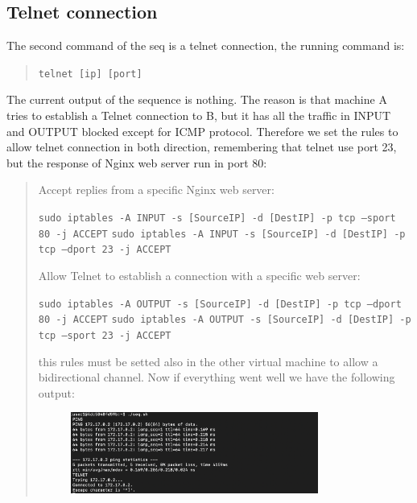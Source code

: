 \documentclass[11pt]{article}
\begin{document}
\subsection{Telnet connection}
The second command of the seq is a telnet connection, the running command is:

\begin{quote}
 \texttt{telnet [ip] [port]}\newline
\end{quote}

The current output of the sequence is nothing. The reason is that machine A tries to establish a Telnet connection to B, but it has all the traffic in INPUT and OUTPUT blocked except for ICMP protocol. Therefore we set the rules to allow telnet connection in both direction, remembering that telnet use port 23, but the response of Nginx web server run in port 80:

\begin{quote}
 Accept replies from a specific Nginx web server:

 \texttt{sudo iptables -A INPUT -s [SourceIP] -d [DestIP] -p tcp --sport 80 -j ACCEPT}\newline
 \texttt{sudo iptables -A INPUT -s [SourceIP] -d [DestIP] -p tcp --dport 23 -j ACCEPT}\newline

 Allow Telnet to establish a connection with a specific web server:

 \texttt{sudo iptables -A OUTPUT -s [SourceIP] -d [DestIP] -p tcp --dport 80 -j ACCEPT}\newline
 \texttt{sudo iptables -A OUTPUT -s [SourceIP] -d [DestIP] -p tcp --sport 23 -j ACCEPT}\newline

 this rules must be setted also in the other virtual machine to allow a bidirectional channel. Now if everything went well we have the following output:

 \begin{figure}[!ht]
 \centering
 \includegraphics[width=0.8\textwidth]{pic5-hw8-1635747.png}
 \label{fig:conf}
 \end{figure}
\end{quote}
\end{document}
